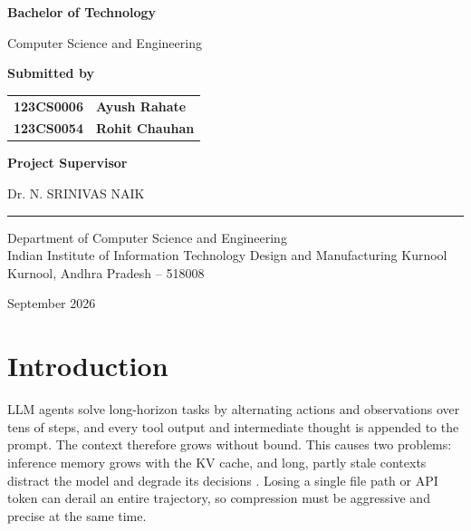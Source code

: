 \documentclass[10pt,a4paper]{article}
\begin{document}
\begin{center}
{\Large\bfseries
Bachelor of Technology
}

\vspace{0.15cm}

{\large
Computer Science and Engineering
}

\vfill

{\large\bfseries
Submitted by
}

\vspace{0.35cm}

\renewcommand{\arraystretch}{1.35}

\begin{tabular}{c l}
\textbf{123CS0006} & \textbf{Ayush Rahate}\\
\textbf{123CS0054} & \textbf{Rohit Chauhan}
\end{tabular}

\vspace{1.0cm}

{\large\bfseries
Project Supervisor
}

\vspace{0.3cm}

{\large
Dr. N. SRINIVAS NAIK
}

\vfill

\rule{0.55\textwidth}{0.4pt}

\vspace{0.35cm}

{\normalsize
Department of Computer Science and Engineering\\
Indian Institute of Information Technology Design and Manufacturing Kurnool\\
Kurnool, Andhra Pradesh -- 518008\par
}

\vspace{0.35cm}

{\normalsize
September 2026
}

\end{center}

\newpage

\section{Introduction}

LLM agents solve long-horizon tasks by alternating actions and observations
over tens of steps, and every tool output and intermediate thought is appended
to the prompt. The context therefore grows without bound. This causes two
problems: inference memory grows with the KV cache, and long, partly stale
contexts distract the model and degrade its decisions \cite{ACON}. Losing a
single file path or API token can derail an entire trajectory, so compression
must be aggressive and precise at the same time.
\end{document}
